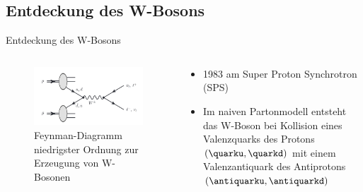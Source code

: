 \documentclass[aspectratio=1610, 9pt]{beamer}
\begin{document}
\subsection{Entdeckung des W-Bosons}
\begin{frame}{Entdeckung des W-Bosons}
  \begin{columns}
    \begin{column}{0.4\textwidth}
      \begin{figure}
        \includegraphics[width=\textwidth]{images/feynman.png}
        \caption{Feynman-Diagramm niedrigster Ordnung zur Erzeugung von W-Bosonen \cite{skript}}
        \label{fig:feynman}
      \end{figure}
    \end{column}
    \begin{column}{0.4\textwidth}
      \begin{itemize}
        \item 1983 am Super Proton Synchrotron (SPS)
        \item Im naiven Partonmodell entsteht das W-Boson bei Kollision eines Valenzquarks des Protons $(\quarku, \quarkd)$ mit einem Valenzantiquark des Antiprotons $(\antiquarku, \antiquarkd)$
      \end{itemize}
    \end{column}
  \end{columns}
\end{frame}
\end{document}
